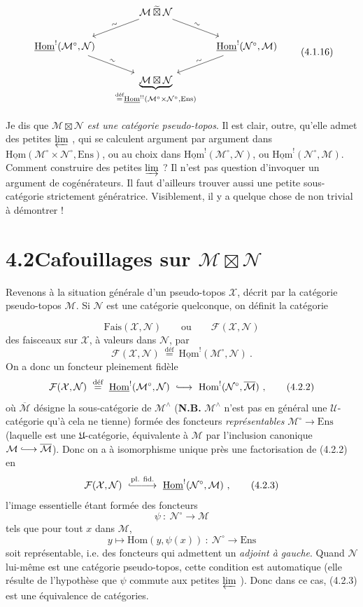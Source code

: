 \documentclass[11pt]{article}
\newcommand{\printedpage}[1]{\marginpar{\footnotesize p.~#1}}
\newcommand{\msp}[1]{\marginpar{\footnotesize [#1]}}
\newcommand{\cM}{\mathcal{M}}
\newcommand{\cN}{\mathcal{N}}
\newcommand{\cX}{\mathcal{X}}
\newcommand{\cF}{\mathcal{F}}
\newcommand{\uHom}{\underline{\mathrm{Hom}}}
\newcommand{\Hom}{\mathrm{Hom}}
\newcommand{\Ens}{\mathrm{Ens}}
\newcommand{\defeq}{\overset{\text{déf}}{=}}
\newcommand{\bt}{\boxtimes}
\newcommand{\tbt}{\mathbin{\widetilde{\boxtimes}}}
\newcommand{\linj}{\lhook\joinrel\longrightarrow}
\begin{document}
\printedpage{4}

\msp{page 57}

\[
\begin{tikzcd}[column sep=small]
 & \cM \tbt \cN \arrow[dl, "\sim" sloped] \arrow[dr, "\sim" sloped] & \\
\uHom^{!}(\cM^{\circ},\cN) \arrow[dr, "\sim" sloped] & & \uHom^{!}(\cN^{\circ},\cM) \arrow[dl, "\sim" sloped] \\
 & \underbrace{\cM \bt \cN}_{\defeq \uHom^{!!}(\cM^{\circ}\times\cN^{\circ},\Ens)} &
\end{tikzcd}
\tag*{(4.1.16)}
\]



Je dis que $\cM \bt \cN$ \textit{est une catégorie pseudo-topos}. Il est clair, outre, qu'elle admet des petites $\varprojlim$ , qui se calculent argument par argument dans $\uHom(\cM^{\circ}\times\cN^{\circ},\Ens)$, ou au choix dans $\uHom^{!}(\cM^{\circ},\cN)$, ou $\uHom^{!}(\cN^{\circ},\cM)$. Comment construire des petites $\varinjlim$ ? Il n'est pas question d'invoquer un argument de cogénérateurs. Il faut d'ailleurs trouver aussi une petite sous-catégorie strictement génératrice. Visiblement, il y a quelque chose de non trivial à démontrer !

\section*{4.2\quad Cafouillages sur $\cM \bt \cN$}

Revenons à la situation générale d'un pseudo-topos $\cX$, décrit par la catégorie pseudo-topos $\cM$. Si $\cN$ est une catégorie quelconque, on définit la catégorie

\msp{page 58}
\[
\mathrm{Fais}(\cX,\cN) \qquad \text{ou} \qquad \cF(\cX,\cN)
\]
des faisceaux sur $\cX$, à valeurs dans $\cN$, par
\[
\cF(\cX,\cN) \ \defeq\ \uHom^{!}(\cM^{\circ},\cN) \ .
\tag*{(4.2.1)}
\]
On a donc un foncteur pleinement fidèle
\[
\cF(\cX,\cN) \ \defeq\ \uHom^{!}(\cM^{\circ},\cN) \ \linj\ \Hom^{!}(\cN^{\circ},\overline{\cM}) \ ,
\tag*{(4.2.2)}
\]
où $\overline{\cM}$ désigne la sous-catégorie de $\cM^{\wedge}$ (\textbf{N.B.} $\cM^{\wedge}$ n'est pas en général une $\mathcal{U}$-catégorie qu'à cela ne tienne) formée des foncteurs \textit{représentables} $\cM^{\circ}\longrightarrow\Ens$ (laquelle est une $\mathfrak{U}$-catégorie, équivalente à $\cM$ par l'inclusion canonique $\cM \linj \overline{\cM}$). Donc on a à isomorphisme unique près une factorisation de (4.2.2) en
\[
\cF(\cX,\cN) \ \overset{\text{pl. fid.}}{\lhook\joinrel\relbar\joinrel\relbar\joinrel\longrightarrow}\ \uHom^{!}(\cN^{\circ},\cM) \ ,
\tag*{(4.2.3)}
\]
l'image essentielle étant formée des foncteurs
\[
\psi \ :\ \cN^{\circ} \longrightarrow \cM
\]
tels que pour tout $x$ dans $\cM$,
\[
y \longmapsto \Hom(y,\psi(x)) \ :\ \cN^{\circ} \longrightarrow \Ens
\]
soit représentable, i.e. des foncteurs qui
\printedpage{5}
\msp{page 59}
admettent un \textit{adjoint à gauche}. Quand $\cN$ lui-même est une catégorie pseudo-topos, cette condition est automatique (elle résulte de l'hypothèse que $\psi$ commute aux petites $\varprojlim$ ). Donc dans ce cas, (4.2.3) est une équivalence de catégories.
\end{document}
